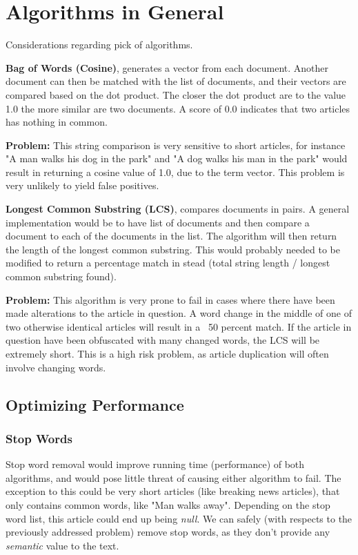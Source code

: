 \chapter{Algorithms in General}

Considerations regarding pick of algorithms. 

\textbf{Bag of Words (Cosine)}, generates a vector from each document.
Another document can then be matched with the list of documents, and their vectors are compared based on the dot product. The closer the dot product are to the value 1.0 the more similar are two documents. A score of 0.0 indicates that two articles has nothing in common.

\textbf{Problem:} This string comparison is very sensitive to short articles, for instance "A man walks his dog in the park" and "A dog walks his man in the park" would result in returning a cosine value of 1.0, due to the term vector. This problem is very unlikely to yield false positives.

\textbf{Longest Common Substring (LCS)}, compares documents in pairs. A general implementation would be to have list of documents and then compare a document to each of the documents in the list. The algorithm will then return the length of the longest common substring. This would probably needed to be modified to return a percentage match in stead (total string length / longest common substring found).

\textbf{Problem:} This algorithm is very prone to fail in cases where there have been made alterations to the article in question. A word change in the middle of one of two otherwise identical articles will result in a ~50 percent match. If the article in question have been obfuscated with many changed words, the LCS will be extremely short. This is a high risk problem, as article duplication will often involve changing words.


\section{Optimizing Performance}
\subsection{Stop Words}
Stop word removal would improve running time (performance) of both algorithms, and would pose little threat of causing either algorithm to fail. The exception to this could be very short articles (like breaking news articles), that only contains common words, like "Man walks away". Depending on the stop word list, this article could end up being \textit{null}.
We can safely (with respects to the previously addressed problem) remove stop words, as they don't provide any \textit{semantic} value to the text.

